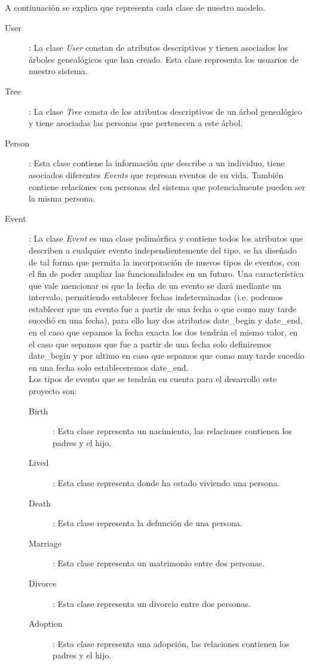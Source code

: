 A continuación se explica que representa cada clase de nuestro modelo.
\begin{description}
	\item[User]: La clase \textit{User} constan de atributos descriptivos y tienen asociados los árboles genealógicos que han creado. Esta clase representa los usuarios de nuestro sistema.
	\item[Tree]: La clase \textit{Tree} consta de los atributos descriptivos de un árbol genealógico y tiene asociadas las personas que pertenecen a este árbol.
	\item[Person]: Esta clase contiene la información que describe a un individuo, tiene asociados diferentes \textit{Events} que represan eventos de su vida. También contiene relaciones con personas del sistema que potencialmente pueden ser la misma persona.
	\item[Event]: La clase \textit{Event} es una clase polimórfica  y contiene todos los atributos que describen a cualquier evento independientemente del tipo, se ha diseñado de tal forma que permita la incorporación de nuevos tipos de eventos, con el fin de poder ampliar las funcionalidades en un futuro. Una característica que vale mencionar es que la fecha de un evento se dará mediante un intervalo, permitiendo establecer fechas indeterminadas (i.e. podemos establecer que un evento fue a partir de una fecha o que como muy tarde sucedió en una fecha), para ello hay dos atributos date\_begin y date\_end, en el caso que sepamos la fecha exacta los dos tendrán el mismo valor, en el caso que sepamos que fue a partir de una fecha solo definiremos date\_begin y por ultimo en caso que sepamos que como muy tarde sucedio en una fecha solo estableceremos date\_end.\\ Los tipos de evento que se tendrán en cuenta para el desarrollo este proyecto son:
	\begin{description}
		\item[Birth]: Esta clase representa un nacimiento, las relaciones contienen los padres y el hijo.
		\item[Lived]: Esta clase representa donde ha estado viviendo una persona.
		\item[Death]: Esta clase representa la defunción de una persona.
		\item[Marriage]: Esta clase representa un matrimonio entre dos personas.
		\item[Divorce]: Esta clase representa un divorcio entre dos personas.
		\item[Adoption]: Esta clase representa una adopción, las relaciones contienen los padres y el hijo.
	\end{description}
\end{description}

